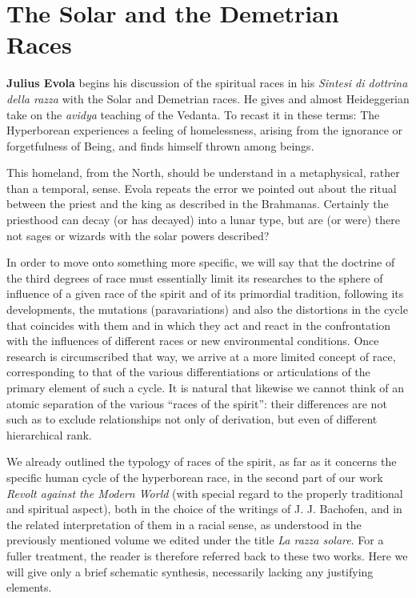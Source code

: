 \section{The Solar and the Demetrian Races}

\begin{quotex}
\textbf{Julius Evola} begins his discussion of the spiritual races in his \emph{Sintesi di dottrina della razza} with the Solar and Demetrian races. He gives and almost Heideggerian take on the \emph{avidya} teaching of the Vedanta. To recast it in these terms: The Hyperborean experiences a feeling of homelessness, arising from the ignorance or forgetfulness of Being, and finds himself thrown among beings.

This homeland, from the North, should be understand in a metaphysical, rather than a temporal, sense. Evola repeats the error we pointed out about the ritual between the priest and the king as described in the Brahmanas. Certainly the priesthood can decay (or has decayed) into a lunar type, but are (or were) there not sages or wizards with the solar powers described?
\end{quotex}

In order to move onto something more specific, we will say that the doctrine of the third degrees of race must essentially limit its researches to the sphere of influence of a given race of the spirit and of its primordial tradition, following its developments, the mutations (paravariations) and also the distortions in the cycle that coincides with them and in which they act and react in the confrontation with the influences of different races or new environmental conditions. Once research is circumscribed that way, we arrive at a more limited concept of race, corresponding to that of the various differentiations or articulations of the primary element of such a cycle. It is natural that likewise we cannot think of an atomic separation of the various ``races of the spirit'': their differences are not such as to exclude relationships not only of derivation, but even of different hierarchical rank.

We already outlined the typology of races of the spirit, as far as it concerns the specific human cycle of the hyperborean race, in the second part of our work \emph{Revolt against the Modern World} (with special regard to the properly traditional and spiritual aspect), both in the choice of the writings of J. J. Bachofen, and in the related interpretation of them in a racial sense, as understood in the previously mentioned volume we edited under the title \emph{La razza solare}. For a fuller treatment, the reader is therefore referred back to these two works. Here we will give only a brief schematic synthesis, necessarily lacking any justifying elements.

